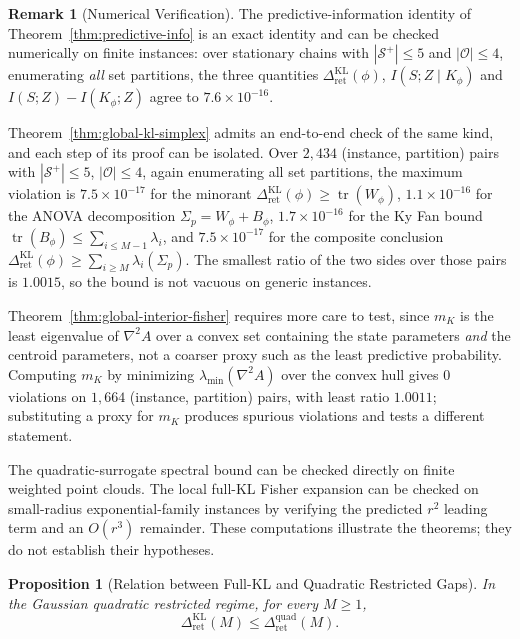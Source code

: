\documentclass[12pt]{article}
\newtheorem{proposition}[theorem]{Proposition}
\theoremstyle{definition}
\newtheorem{remark}[theorem]{Remark}
\DeclareMathOperator{\tr}{tr}
\newcommand{\RetKL}{\Delta_{\mathrm{ret}}^{\mathrm{KL}}}
\newcommand{\RetQuad}{\Delta_{\mathrm{ret}}^{\mathrm{quad}}}
\newcommand{\Splus}{\mathcal S^{+}}
\begin{document}
\begin{remark}[Numerical Verification]
\label{rem:retention-numerical}
The predictive-information identity of Theorem~\ref{thm:predictive-info} is an
exact identity and can be checked numerically on finite instances: over
stationary chains with $|\Splus|\le5$ and $|\mathcal O|\le4$, enumerating
\emph{all} set partitions, the three quantities $\RetKL(\phi)$,
$I(S;Z\mid K_\phi)$ and $I(S;Z)-I(K_\phi;Z)$ agree to $7.6\times10^{-16}$.

Theorem~\ref{thm:global-kl-simplex} admits an end-to-end check of the same
kind, and each step of its proof can be isolated.  Over $2{,}434$
(instance, partition) pairs with $|\Splus|\le5$, $|\mathcal O|\le4$, again
enumerating all set partitions, the maximum violation is
$7.5\times10^{-17}$ for the minorant $\RetKL(\phi)\ge\tr(W_\phi)$,
$1.1\times10^{-16}$ for the ANOVA decomposition
$\Sigma_p=W_\phi+B_\phi$, $1.7\times10^{-16}$ for the Ky Fan bound
$\tr(B_\phi)\le\sum_{i\le M-1}\lambda_i$, and $7.5\times10^{-17}$ for the
composite conclusion $\RetKL(\phi)\ge\sum_{i\ge M}\lambda_i(\Sigma_p)$.  The
smallest ratio of the two sides over those pairs is $1.0015$, so the bound is
not vacuous on generic instances.

Theorem~\ref{thm:global-interior-fisher} requires more care to test, since
$m_K$ is the least eigenvalue of $\nabla^2A$ over a convex set containing the
state parameters \emph{and} the centroid parameters, not a coarser proxy such
as the least predictive probability.  Computing $m_K$ by minimizing
$\lambda_{\min}(\nabla^2A)$ over the convex hull gives $0$ violations on
$1{,}664$ (instance, partition) pairs, with least ratio $1.0011$; substituting
a proxy for $m_K$ produces spurious violations and tests a different statement.

The quadratic-surrogate spectral bound can be checked directly on finite
weighted point clouds.  The local full-KL Fisher expansion can be checked on
small-radius exponential-family instances by verifying the predicted $r^2$
leading term and an $O(r^3)$ remainder.  These computations illustrate the
theorems; they do not establish their hypotheses.
\end{remark}

\begin{proposition}[Relation between Full-KL and Quadratic Restricted Gaps]
\label{prop:retkl-le-retquad}
In the Gaussian quadratic restricted regime, for every $M\ge1$,
\[
\RetKL(M)\le \RetQuad(M).
\]
\end{proposition}
\end{document}
